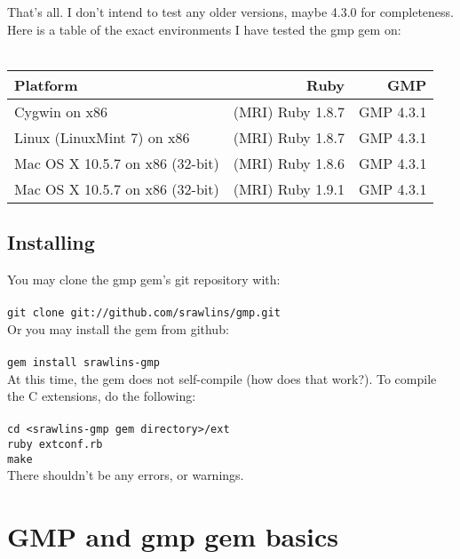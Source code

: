\documentclass[pdftex,10pt]{article}
\begin{document}
That's all. I don't intend to test any older versions, maybe 4.3.0 for completeness.\\

Here is a table of the exact environments I have tested the gmp gem on:\\\\

\begin{tabular}{lrr} \hline
             Platform             &       Ruby       &    GMP    \\ \midrule[1pt]
  Cygwin on x86                   & (MRI) Ruby 1.8.7 & GMP 4.3.1 \\ \hline
  Linux (LinuxMint 7) on x86      & (MRI) Ruby 1.8.7 & GMP 4.3.1 \\ \hline
  Mac OS X 10.5.7 on x86 (32-bit) & (MRI) Ruby 1.8.6 & GMP 4.3.1 \\ \hline
  Mac OS X 10.5.7 on x86 (32-bit) & (MRI) Ruby 1.9.1 & GMP 4.3.1 \\ \hline
\end{tabular}

\subsection{Installing}
You may clone the gmp gem's git repository with:\\
\\
\texttt{git clone git://github.com/srawlins/gmp.git}\\

Or you may install the gem from github:\\
\\
\texttt{gem install srawlins-gmp}\\

At this time, the gem does not self-compile (how does that work?). To compile the C
extensions, do the following:\\
\\
\texttt{cd <srawlins-gmp gem directory>/ext}\\
\texttt{ruby extconf.rb}\\
\texttt{make}\\

There shouldn't be any errors, or warnings.

\section{GMP and gmp gem basics}
\end{document}
